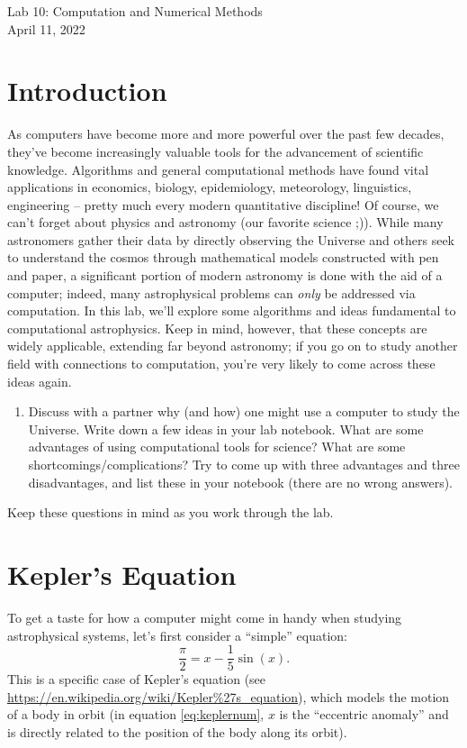 \documentclass[11pt]{article}
\begin{document}
\begin{center}
\huge{Lab 10: Computation and Numerical Methods}\\ \medskip \Large{April 11, 2022}
\end{center}

\section{Introduction}
As computers have become more and more powerful over the past few decades, they've become increasingly valuable tools for the advancement of scientific knowledge. Algorithms and general computational methods have found vital applications in economics, biology, epidemiology, meteorology, linguistics, engineering -- pretty much every modern quantitative discipline! Of course, we can't forget about physics and astronomy (our favorite science ;)). While many astronomers gather their data by directly observing the Universe and others seek to understand the cosmos through mathematical models constructed with pen and paper, a significant portion of modern astronomy is done with the aid of a computer; indeed, many astrophysical problems can \textit{only} be addressed via computation. In this lab, we'll explore some algorithms and ideas fundamental to computational astrophysics. Keep in mind, however, that these concepts are widely applicable, extending far beyond astronomy; if you go on to study another field with connections to computation, you're very likely to come across these ideas again.

\begin{enumerate}
    \item Discuss with a partner why (and how) one might use a computer to study the Universe. Write down a few ideas in your lab notebook. What are some advantages of using computational tools for science? What are some shortcomings/complications? Try to come up with three advantages and three disadvantages, and list these in your notebook (there are no wrong answers). 
\end{enumerate}
\noindent
Keep these questions in mind as you work through the lab.

\section{Kepler's Equation}
To get a taste for how a computer might come in handy when studying astrophysical systems, let's first consider a ``simple'' equation:
\begin{equation} \label{eq:keplernum}
    \frac{\pi}{2} = x - \frac{1}{5} \sin(x).
\end{equation}
This is a specific case of Kepler's equation (see  \url{https://en.wikipedia.org/wiki/Kepler\%27s_equation}), which models the motion of a body in orbit (in equation \ref{eq:keplernum}, $x$ is the ``eccentric anomaly'' and is directly related to the position of the body along its orbit).
\end{document}
